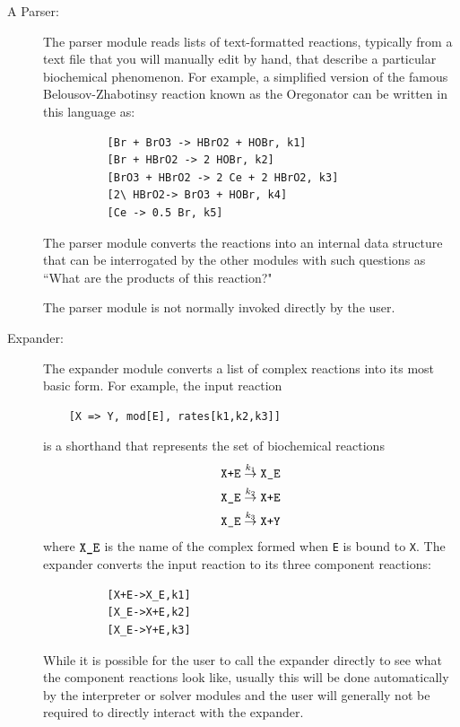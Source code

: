 \begin{description}
\item [A Parser:]

The parser module reads lists of text-formatted reactions, typically from a text file that you will manually edit by hand, that describe a particular biochemical phenomenon.  For example, a simplified version of the famous Belousov-Zhabotinsy reaction\cite{BZ1,BZ2} known as the Oregonator\cite{Oregonator1,Oregonator2} can be written in this language as:

\begin{verbatim}
          [Br + BrO3 -> HBrO2 + HOBr, k1] 
          [Br + HBrO2 -> 2 HOBr, k2]
          [BrO3 + HBrO2 -> 2 Ce + 2 HBrO2, k3] 
          [2\ HBrO2-> BrO3 + HOBr, k4] 
          [Ce -> 0.5 Br, k5]
\end{verbatim}

The parser module converts the reactions into an internal data structure that can be interrogated by the other modules with such questions as ``What are the products of this reaction?"

The parser module is not normally invoked directly by the user. 

\item [Expander:] The expander module converts a list of complex reactions into its most basic form. For example, the input reaction

\begin{verbatim}
	[X => Y, mod[E], rates[k1,k2,k3]]
\end{verbatim}

is a shorthand that represents the set of biochemical reactions
\begin{align*}
\text{\tt{X+E}}&\overset{k_1}{\to}\text{\tt{X\_E}}\\
\text{\tt{X\_E}}&\overset{k_2}{\to}\text{\tt{X+E}}\\
\text{\tt{X\_E}}&\overset{k_3}{\to}\text{\tt{X+Y}}
\end{align*}
where $\text{\tt{X\_E}}$ is the name of the complex formed when {\tt E} is bound to {\tt X}.  The expander converts the input reaction to its three component reactions: 
\begin{verbatim}
          [X+E->X_E,k1]
          [X_E->X+E,k2]
          [X_E->Y+E,k3]
\end{verbatim}

While it is possible for the user to call the expander directly to see what the component reactions look like, usually this will be done automatically by the interpreter or solver modules and the user will generally not be required to directly interact with the expander. 


\end{description}
